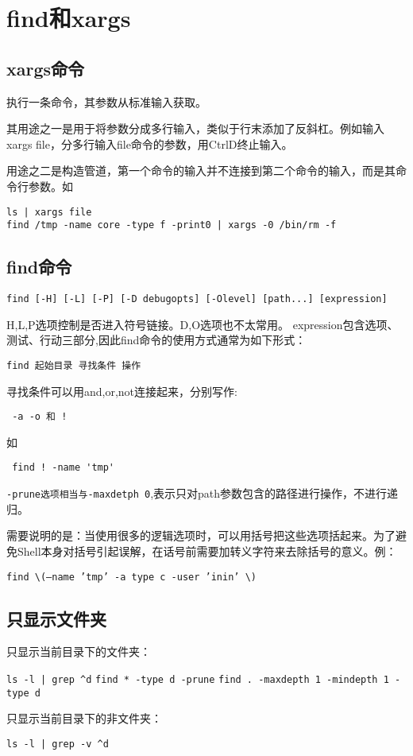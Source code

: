 \section{find和xargs}

\subsection{xargs命令}
执行一条命令，其参数从标准输入获取。

其用途之一是用于将参数分成多行输入，类似于行末添加了反斜杠。例如输入xargs file，分多行输入file命令的参数，用CtrlD终止输入。

用途之二是构造管道，第一个命令的输入并不连接到第二个命令的输入，而是其命令行参数。如

\begin{verbatim}
ls | xargs file
find /tmp -name core -type f -print0 | xargs -0 /bin/rm -f
\end{verbatim}

\subsection{find命令}
\begin{verbatim}
find [-H] [-L] [-P] [-D debugopts] [-Olevel] [path...] [expression]
\end{verbatim}
H,L,P选项控制是否进入符号链接。D,O选项也不太常用。
expression包含选项、测试、行动三部分,因此find命令的使用方式通常为如下形式：

\verb+find 起始目录 寻找条件 操作+

寻找条件可以用and,or,not连接起来，分别写作:

\verb+ -a -o 和 !+

如

\verb+ find ! -name 'tmp'+

\verb+-prune选项相当与-maxdetph 0+,表示只对path参数包含的路径进行操作，不进行递归。

需要说明的是：当使用很多的逻辑选项时，可以用括号把这些选项括起来。为了避免Shell本身对括号引起误解，在话号前需要加转义字符来去除括号的意义。例：

\verb+find \(–name ’tmp’ -a type c -user ’inin’ \)+


\subsection{只显示文件夹}
只显示当前目录下的文件夹：

\verb+ls -l | grep ^d+
\verb+find * -type d -prune+
\verb+find . -maxdepth 1 -mindepth 1 -type d+

只显示当前目录下的非文件夹：

\verb+ls -l | grep -v ^d+

